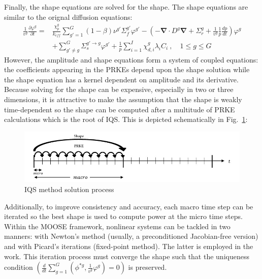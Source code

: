 \documentclass[12pt]{article}
\newcommand{\bs}[1]{\mathbf{#1}}
\renewcommand{\div}{\bs{\nabla}\! \cdot \!}
\newcommand{\grad}{\bs{\nabla}}
\newcommand{\fig}[1]{Fig.~\ref{#1}}                      %
\newcommand{\keff}{k_\textit{eff}}
\begin{document}
Finally, the shape equations are solved for the shape. The shape equations are similar to the orignal diffusion equations:
\begin{align}
\frac{1}{v^g} \frac{\partial \varphi^g }{\partial t} =& \frac{\chi_p^g}{\keff} \sum_{g'=1}^G (1-\beta) \nu^{g'} \Sigma_f^{g'} \varphi^{g'} -  \left( -\div D^g \grad  + \Sigma_r^g + \frac{1}{v^g}\frac{1}{p}\frac{dp}{dt}\right) \varphi^g  \nonumber \\
&  + \sum_{g'\neq g}^G\Sigma_s^{g'\to g} \varphi^{g'}  + \frac{1}{p}\sum_{i=1}^I\chi_{d,i}^g\lambda_i C_i \ , \quad 1 \le g \le G 
\label{eq:shape}
\end{align}
However, the amplitude and shape equations form a system of coupled equations: the coefficients appearing in the PRKEs depend upon the shape solution while the shape equation has a kernel dependent on amplitude and its derivative.  Because solving for the shape can be expensive, especially in two or three dimensions, it is attractive to make the assumption that the shape is weakly time-dependent so the shape can be computed after a multitude of PRKE calculations which is the root of IQS.  This is depicted schematically in \fig{fig:IQS}:
%
\begin{figure}[h]
\includegraphics[width=\linewidth]{figures/IQS_visualization.jpg}
\caption{IQS method solution process}
\label{fig:IQS}
\end{figure}
%

Additionally, to improve consistency and accuracy, each macro time step can be iterated so the best shape is used to compute power at the micro time steps. Within the MOOSE framework,
nonlinear systems can be tackled in two manners: with Newton's method (usually, a preconditioned Jacobian-free version) and with Picard's iterations (fixed-point method). The latter is employed in the work. This iteration process must converge the shape such that the uniqueness condition $(\frac{d}{dt}\sum_{g=1}^G\left(\phi^{*g},\frac{1}{v^g}\varphi^g\right)=0)$ is preserved.


%
\end{document}
